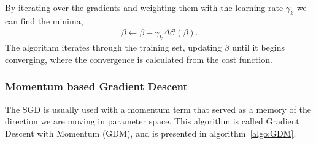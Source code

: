 \documentclass[english,notitlepage,reprint,nofootinbib]{revtex4-2}  %
\begin{document}


By iterating over the gradients and weighting them with the learning rate $\gamma_k$ we can find the minima, 
\begin{align}
    \beta \leftarrow \beta - \gamma_k \Delta \mathcal{C}(\beta). 
\end{align}
The algorithm iterates through the training set, updating $\beta$ until it begins converging, where the convergence is calculated from the cost function. 

\subsubsection*{Momentum based Gradient Descent}%
The SGD is usually used with a momentum term that served as a memory of the direction we are moving in parameter space. This algorithm is called Gradient Descent with Momentum (GDM), and is presented in algorithm~\ref{algo:GDM}. 
\end{document}
